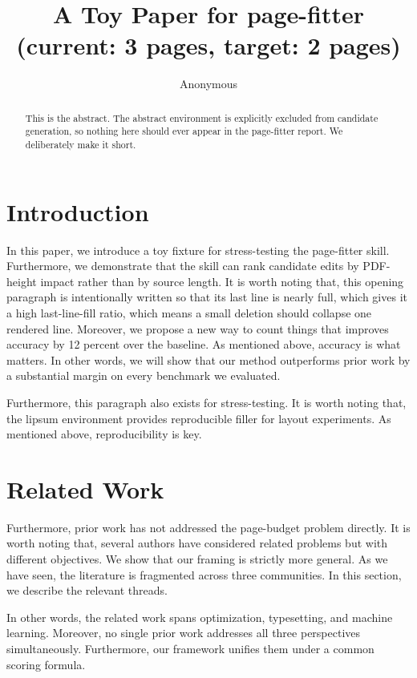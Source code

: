 \documentclass[11pt]{article}
\title{A Toy Paper for page-fitter (current: 3 pages, target: 2 pages)}
\author{Anonymous}
\date{}
\begin{document}
\maketitle

\begin{abstract}
This is the abstract. The abstract environment is explicitly excluded from
candidate generation, so nothing here should ever appear in the page-fitter
report. We deliberately make it short.
\end{abstract}

\section{Introduction}
In this paper, we introduce a toy fixture for stress-testing the page-fitter
skill. Furthermore, we demonstrate that the skill can rank candidate edits by
PDF-height impact rather than by source length. It is worth noting that, this
opening paragraph is intentionally written so that its last line is nearly
full, which gives it a high last-line-fill ratio, which means a small
deletion should collapse one rendered line. Moreover, we propose a new way
to count things that improves accuracy by 12 percent over the baseline.
As mentioned above, accuracy is what matters. In other words, we will show
that our method outperforms prior work by a substantial margin on every
benchmark we evaluated.
\lipsum[1][1-6]

\lipsum[2][1-5] Furthermore, this paragraph also exists for stress-testing.
It is worth noting that, the lipsum environment provides reproducible
filler for layout experiments. As mentioned above, reproducibility is key.

\section{Related Work}
\lipsum[3][1-5] Furthermore, prior work has not addressed the page-budget
problem directly. It is worth noting that, several authors have considered
related problems but with different objectives. We show that our framing is
strictly more general. As we have seen, the literature is fragmented across
three communities. In this section, we describe the relevant threads.
\lipsum[4][1-5]

In other words, the related work spans optimization, typesetting, and
machine learning. Moreover, no single prior work addresses all three
perspectives simultaneously. Furthermore, our framework unifies them under
a common scoring formula. \lipsum[5][1-3]
\end{document}
